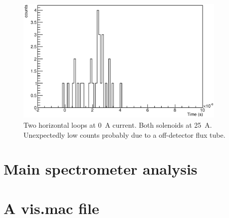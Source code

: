 \begin{figure}
\centering
	\includegraphics[width = 0.9\textwidth]{graphics/analysis/monSpec/ND.eps}
	\caption[\SI{50}{\ampere} loops]{Two horizontal loops at \SI{0}{\ampere} current. Both solenoids at \SI{25}{\ampere}. Unexpectedly low counts probably due to a off-detector flux tube. }
	\label{fig:ND}
\end{figure}
\clearpage











\section{Main spectrometer analysis}
\label{ch:annex:sec:mainSpec}


\section{A vis.mac file}
\label{ch:annex:sec:vis.mac}

